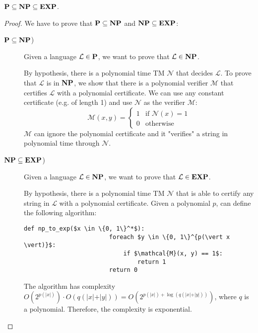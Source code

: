 \begin{theorem} \label{th:P_NP_EXP_relationship}
    $\P \subseteq \NP \subseteq \EXP$.

    \begin{proof}
        We have to prove that $\P \subseteq \NP$ and $\NP \subseteq \EXP$:
        \begin{description}
            \item[$\P \subseteq \NP$)] 
                Given a language $\mathcal{L} \in \P$, we want to prove that $\mathcal{L} \in \NP$.
                
                By hypothesis, there is a polynomial time TM $\mathcal{N}$ that decides $\mathcal{L}$.
                To prove that $\mathcal{L}$ is in $\NP$, 
                we show that there is a polynomial verifier $\mathcal{M}$ that certifies $\mathcal{L}$ with a polynomial certificate.
                We can use any constant certificate (e.g. of length 1) and 
                use $\mathcal{N}$ as the verifier $\mathcal{M}$:
                \[  
                    \mathcal{M}(x, y) = \begin{cases}
                        1 & \text{if $\mathcal{N}(x) = 1$} \\
                        0 & \text{otherwise}
                    \end{cases}    
                \]
                $\mathcal{M}$ can ignore the polynomial certificate and it "verifies" a string in polynomial time through $\mathcal{N}$.
            
            \item[$\NP \subseteq \EXP$)]
                Given a language $\mathcal{L} \in \NP$, we want to prove that $\mathcal{L} \in \EXP$.
                
                By hypothesis, there is a polynomial time TM $\mathcal{N}$ that is able to certify any string in $\mathcal{L}$ with a polynomial certificate.
                Given a polynomial $p$, can define the following algorithm:
                \begin{lstlisting}[mathescape=true]
                    def np_to_exp($x \in \{0, 1\}^*$):
                        foreach $y \in \{0, 1\}^{p(\vert x \vert)}$:
                            if $\mathcal{M}(x, y) == 1$:
                                return 1
                        return 0
                \end{lstlisting}
                The algorithm has complexity 
                $O(2^{p(\vert x \vert)}) \cdot O(q(\vert x \vert + \vert y \vert)) = O(2^{p(\vert x \vert) + \log(q(\vert x \vert + \vert y \vert))})$,
                where $q$ is a polynomial.
                Therefore, the complexity is exponential.
        \end{description}
    \end{proof}
\end{theorem}


